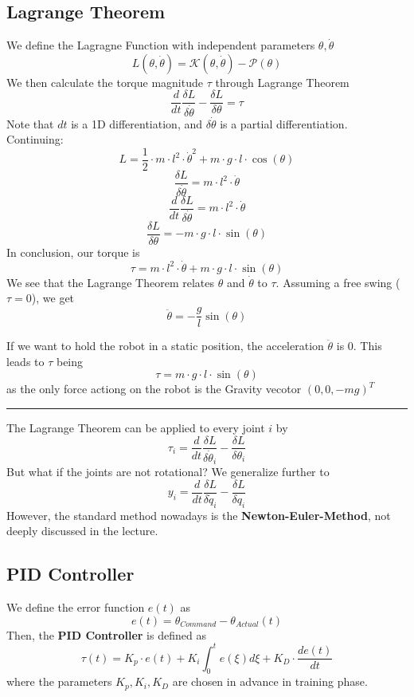 \documentclass{exerciseBlue}
\begin{document}
\subsection{Lagrange Theorem}
We define the Lagragne Function with independent parameters $\theta,\dot{\theta}$
$$L(\theta,\dot{\theta}) = \mathcal{K}(\theta, \dot{\theta})-\mathcal{P}(\theta)$$
We then calculate the torque magnitude $\tau$ through Lagrange Theorem
$$\dfrac{d}{dt}\dfrac{\delta L}{\delta \dot{\theta}}-\dfrac{\delta L}{\delta \theta} = \tau$$
Note that $dt$ is a 1D differentiation, and $\delta \dot{\theta}$ is a partial differentiation.\\
Continuing:
$$L = \dfrac{1}{2}\cdot m \cdot l^2 \cdot \dot{\theta}^2 + m\cdot g \cdot l\cdot\cos (\theta)$$
$$\dfrac{\delta L}{\delta \dot{\theta}} = m \cdot l^2 \cdot \dot{\theta}$$
$$\dfrac{d}{dt}\dfrac{\delta L}{\delta \dot{\theta}} = m \cdot l^2 \cdot \dot{\theta} $$
$$\dfrac{\delta L}{\delta {\theta}} = -m\cdot g \cdot l\cdot\sin (\theta)$$
In conclusion, our torque is 
$$\tau = m \cdot l^2 \cdot \dot{\theta} + m\cdot g \cdot l\cdot\sin (\theta)$$
We see that the Lagrange Theorem relates $\theta$ and $\dot{\theta}$ to $\tau$. Assuming a free swing ($\tau = 0$), we get 
$$\ddot{\theta} = - \dfrac{g}{l}\sin(\theta)$$
\par If we want to hold the robot in a static position, the acceleration $\ddot{\theta}$ is 0. This leads to $\tau$ being
$$\tau = m \cdot g \cdot l \cdot \sin(\theta)$$ as the only force actiong on the robot is the Gravity vecotor $(0,0,-mg)^T$\\
\noindent\rule{\textwidth}{0.3pt}
\par The Lagrange Theorem can be applied to every joint $i$ by 
$$\tau_i = \dfrac{d}{dt}\dfrac{\delta L}{\delta \dot{\theta}_i}-\dfrac{\delta L}{\delta \theta_i}$$
But what if the joints are not rotational? We generalize further to
$$y_i = \dfrac{d}{dt}\dfrac{\delta L}{\delta \dot{q}_i}-\dfrac{\delta L}{\delta q_i}$$
However, the standard method nowadays is the \textbf{Newton-Euler-Method}, not deeply discussed in the lecture.
\subsection{PID Controller}
We define the error function $e(t)$ as
$$e(t) = \theta_{Command} - \theta_{Actual}(t)$$
Then, the \textbf{PID Controller} is defined as
$$\tau (t) = K_p\cdot e(t)+K_i\int_{0}^{t}e(\xi)d\xi + K_D\cdot \dfrac{de(t)}{dt}$$
where the parameters $K_p, K_i, K_D$ are chosen in advance in training phase.
\end{document}
